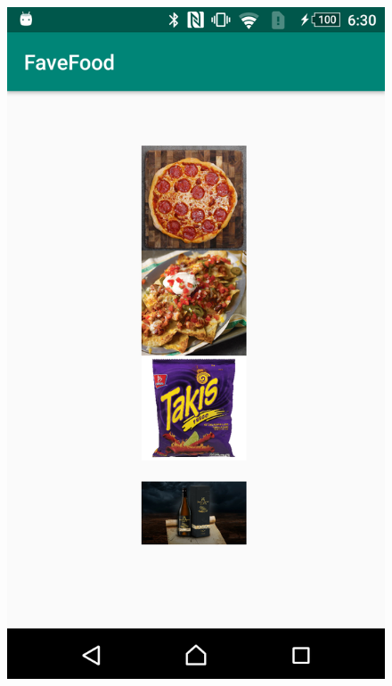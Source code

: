 \documentclass{scrartcl}
\begin{document}
\begin{figure}[h]
    \includegraphics[scale=0.15]{images/screen5.png}

\end{figure}
\end{document}
